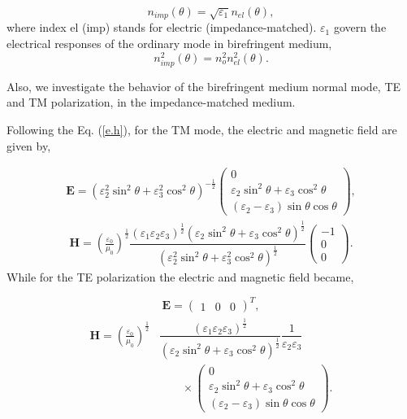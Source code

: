 \documentclass[9pt,twocolumn,twoside]{osajnl}
\begin{document}
\begin{equation}\label{comper-n}
n_{imp}(\theta)=\sqrt{\varepsilon_{1}}n_{el}(\theta),
\end{equation}
where index el (imp) stands for  electric (impedance-matched). ${\varepsilon_{1}}$ govern the electrical responses of the ordinary mode in birefringent medium,
\begin{equation}\label{comper-n1}
n_{imp}^{2}(\theta)=n_{o}^{2}n_{el}^{2}(\theta).
\end{equation}

 Also, we investigate the behavior of the birefringent medium normal mode, TE and TM polarization, in the impedance-matched medium.
 
Following the Eq. (\ref{e.h}),  for the TM mode, the electric and magnetic field are given by,

 \begin{align}
  \mathbf{E}=\left(\varepsilon_{2}^{2} \sin^{2}{\theta} + \varepsilon_{3}^{2}\cos^{2}{\theta}\right)^{-\frac{1}{2}}
 \begin{pmatrix}
 0\\
  \varepsilon_{2} \sin^{2}\theta + \varepsilon_{3}\cos^{2}\theta\\
 (\varepsilon_{2}-\varepsilon_{3})\sin\theta\cos\theta
 \end{pmatrix},
\end{align}
\begin{align}
  \mathbf{H}=\left(\frac{\varepsilon_{0}}{\mu_{0}}\right)^{\frac{1}{2}}\dfrac{(\varepsilon_{1}\varepsilon_{2}\varepsilon_{3})^{\frac{1}{2}}({\varepsilon_{2}\sin^{2}{\theta}+\varepsilon_{3}\cos^{2}{\theta}})^{\frac{1}{2}}}{(\varepsilon_{2}^{2} \sin^{2}{\theta} + \varepsilon_{3}^{2}\cos^{2}{\theta})^{\frac{1}{2}}}
 \begin{pmatrix}
 -1\\0\\0
 \end{pmatrix}.
 \end{align}
While for the TE polarization the electric and magnetic field became,

\begin{equation}\label{e-te-im}
\mathbf{E}=
 \begin{pmatrix}
 1&0&0
 \end{pmatrix}^{T},
\end{equation}
\begin{align}\label{h-te-im}
\begin{split}
  \mathbf{H}= \left(\frac{\varepsilon_{0}}{\mu_{0}}\right)^{\frac{1}{2}}&\dfrac{(\varepsilon_{1}\varepsilon_{2}\varepsilon_{3})^{\frac{1}{2}}}{({\varepsilon_{2}\sin^{2}{\theta}+\varepsilon_{3}\cos^{2}{\theta}})^{\frac{1}{2}}}\dfrac{1}{\varepsilon_{2}\varepsilon_{3}}
  \\ & \qquad\times
  \begin{pmatrix}
  0\\
 \varepsilon_{2} \sin^{2}\theta + \varepsilon_{3}\cos^{2}\theta\\
 (\varepsilon_{2}-\varepsilon_{3})\sin\theta\cos\theta
 \end{pmatrix}.
\end{split}
\end{align}
\end{document}
